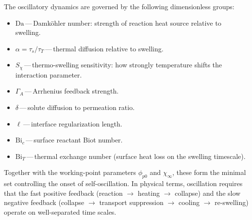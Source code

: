 \documentclass[11pt]{article}
\newcommand{\Da}{\mathrm{Da}}
\newcommand{\Bi}{\mathrm{Bi}}
\newcommand{\pp}{\phi_{p0}}
\begin{document}
The oscillatory dynamics are governed by the following dimensionless groups:
\begin{itemize}
  \item $\Da$\,---\,Damk\"ohler number: strength of reaction heat source relative to swelling.
  \item $\alpha = \tau_s/\tau_T$\,---\,thermal diffusion relative to swelling.
  \item $S_\chi$\,---\,thermo-swelling sensitivity: how strongly temperature shifts the interaction parameter.
  \item $\Gamma_A$\,---\,Arrhenius feedback strength.
  \item $\delta$\,---\,solute diffusion to permeation ratio.
  \item $\ell$\,---\,interface regularization length.
  \item $\Bi_c$\,---\,surface reactant Biot number.
  \item $\Bi_T$\,---\,thermal exchange number (surface heat loss on the swelling timescale).
\end{itemize}
Together with the working-point parameters $\pp$ and $\chi_\infty$, these form the minimal set controlling the onset of self-oscillation. In physical terms, oscillation requires that the fast positive feedback (reaction $\to$ heating $\to$ collapse) and the slow negative feedback (collapse $\to$ transport suppression $\to$ cooling $\to$ re-swelling) operate on well-separated time scales.

\end{document}
